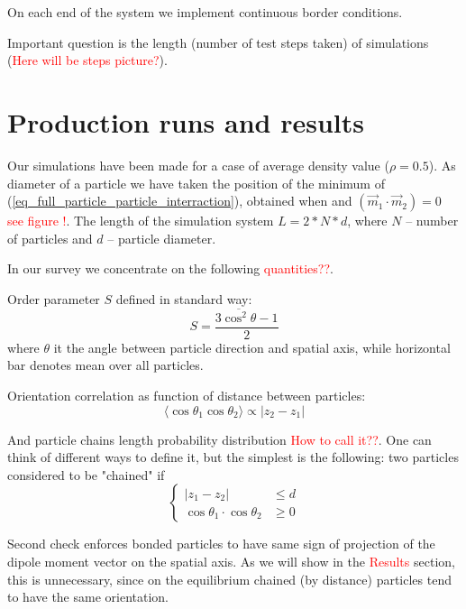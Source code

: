 \documentclass[12pt,a4paper]{article}
\begin{document}
On each end of the system we implement continuous border conditions.

Important question is the length (number of test steps taken) of simulations (\textcolor{red}{Here will be steps picture?}).

\section{Production runs and results}

Our simulations have been made for a case of average density value ($\rho = 0.5$). As diameter of a particle we have taken the position of the minimum of (\ref{eq_full_particle_particle_interraction}), obtained when and $(\vec{m}_1 \cdot \vec{m}_2) = 0$ \textcolor{red}{see figure !}. The length of the simulation system $L = 2*N*d$, where $N$ -- number of particles and $d$ -- particle diameter.

In our survey we concentrate on the following \textcolor{red}{quantities??}.

Order parameter $S$ defined in standard way:
\begin{equation}
S = \frac{3 \overline{\cos^2 \theta} - 1}{2}
\end{equation}
where $\theta$ it the angle between particle direction and spatial axis, while horizontal bar denotes mean over all particles.

Orientation correlation as function of distance between particles:
\begin{equation}
\langle\cos \theta_1 \cos \theta_2\rangle \propto |z_2 - z_1|
\end{equation}

And particle chains length probability distribution \textcolor{red}{How to call it??}. One can think of different ways to define it, but the simplest is the following: two particles considered to be "chained" if 
\begin{equation}
\begin{cases}
	|z_1 - z_2| &\leq d\\
	\cos \theta_1 \cdot \cos \theta_2 &\geq 0
\end{cases}
\end{equation}

Second check enforces bonded particles to have same sign of projection of the dipole moment vector on the spatial axis. As we will show in the \textcolor{red}{Results} section, this is unnecessary, since on the equilibrium chained (by distance) particles tend to have the same orientation.




\end{document}
